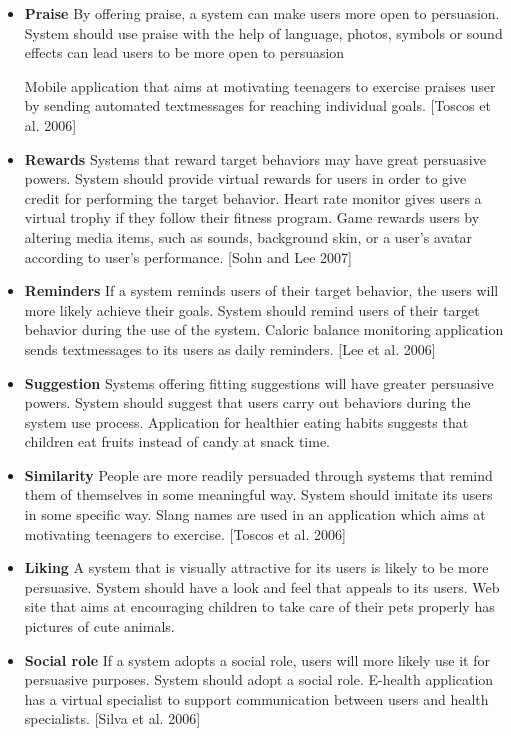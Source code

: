 \begin{itemize}
	\item \textbf{Praise}
	By offering praise, a system can make users more open to
	persuasion.
	System should use praise with the help of language, photos, symbols or sound effects can lead users to be more open to persuasion
	
	Mobile application that aims
	at motivating teenagers to
	exercise praises user by
	sending automated textmessages
	for reaching
	individual goals. [Toscos et al. 2006]
	\item \textbf{Rewards}
	Systems that reward target
	behaviors may have great
	persuasive powers.
	System should provide virtual
	rewards for users in order to
	give credit for performing the
	target behavior.
	Heart rate monitor gives
	users a virtual trophy if they
	follow their fitness program.
	Game rewards users by
	altering media items, such as
	sounds, background skin, or
	a user’s avatar according to
	user’s performance. [Sohn
	and Lee 2007]
	\item \textbf{Reminders}
	If a system reminds users of
	their target behavior, the
	users will more likely achieve
	their goals.
	System should remind users
	of their target behavior during
	the use of the system.
	Caloric balance monitoring
	application sends textmessages
	to its users as
	daily reminders. [Lee et al.
	2006]
	\item \textbf{Suggestion}
	Systems offering fitting
	suggestions will have greater
	persuasive powers.
	System should suggest that
	users carry out behaviors
	during the system use
	process.
	Application for healthier
	eating habits suggests that
	children eat fruits instead of
	candy at snack time.
	\item \textbf{Similarity}
	People are more readily
	persuaded through systems
	that remind them of
	themselves in some
	meaningful way.
	System should imitate its
	users in some specific way.
	Slang names are used in an
	application which aims at
	motivating teenagers to
	exercise. [Toscos et al. 2006]
	\item \textbf{Liking}
	A system that is visually
	attractive for its users is likely
	to be more persuasive.
	System should have a look
	and feel that appeals to its
	users.
	Web site that aims at
	encouraging children to take
	care of their pets properly has
	pictures of cute animals.
	\item \textbf{Social role}
	If a system adopts a social
	role, users will more likely use
	it for persuasive purposes.
	System should adopt a social
	role.
	E-health application has a
	virtual specialist to support
	communication between
	users and health specialists.
	[Silva et al. 2006]
\end{itemize}



